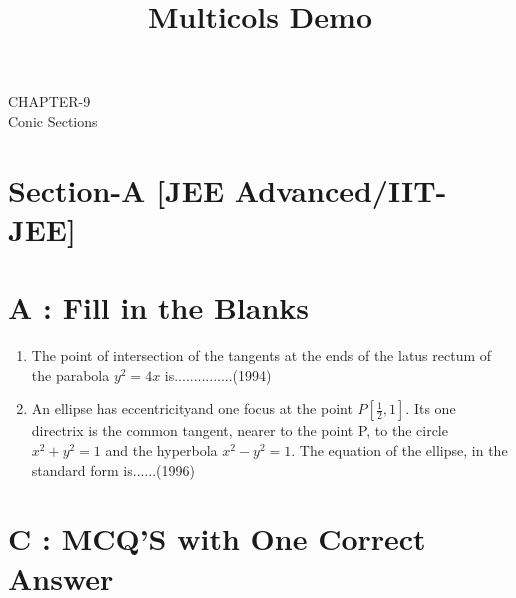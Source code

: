 \documentclass[12pt]{article}
\title{Multicols Demo}
\providecommand{\sbrak}[1]{\ensuremath{{}\left[#1\right]}}
\begin{document}
\begin{center}
\textbf\large{CHAPTER-9 \\ Conic Sections}

\end{center}
\fi
\section*{Section-A    [JEE Advanced/IIT-JEE]}
\section*{A    :  Fill in the Blanks}
\begin{enumerate}
\item The point of intersection of the tangents at the ends of the latus rectum of the parabola $y^2=4x$ is...............(1994)
\item An ellipse has eccentricityand one focus at the point $P\sbrak{\frac{1}{2},1}$. Its one directrix is the common tangent, nearer to the point P, to the circle $x^2+y^2=1$ and the hyperbola $x^2-y^2=1$. The equation of the ellipse, in the standard form is......(1996)
\end{enumerate}

\section*{C  :   MCQ'S with One Correct Answer}
\end{document}
